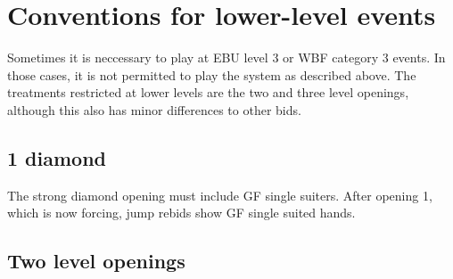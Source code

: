 \documentclass[a4paper,14pt]{extarticle}
\begin{document}
\newpage

\section{Conventions for lower-level events}
\label{sec:level3}

Sometimes it is neccessary to play at EBU level 3 or WBF category 3 events. In
those cases, it is not permitted to play the system as described above. The
treatments restricted at lower levels are the two and three level openings, 
although this also has minor differences to other bids.

\subsection{1 diamond}

The strong diamond opening must include GF single suiters. After opening
1\diamonds, which is now forcing, jump rebids show GF single suited hands.

\subsection{Two level openings}
\end{document}
